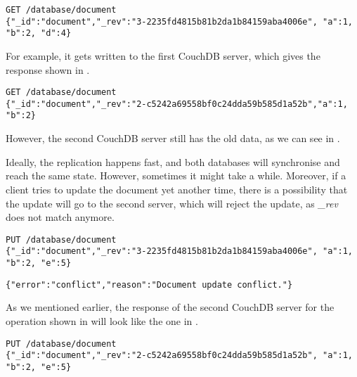\begin{lstlisting}[caption={The result of requesting the \textit{document} from CouchDB-1.}, label={lst:rwork5}]
GET /database/document
{"_id":"document","_rev":"3-2235fd4815b81b2da1b84159aba4006e", "a":1, "b":2, "d":4}
\end{lstlisting}

For example, it gets written to the first CouchDB server, which gives the response shown in .

\begin{lstlisting}[caption={The result of requesting the \textit{document} from CouchDB-2.}, label={lst:rwork6}]
GET /database/document
{"_id":"document","_rev":"2-c5242a69558bf0c24dda59b585d1a52b","a":1, "b":2}
\end{lstlisting}

However, the second CouchDB server still has the old data, as we can see in .

Ideally, the replication happens fast, and both databases will synchronise and reach the same state. However, sometimes it might take a while. Moreover, if a client tries to update the document yet another time, there is a possibility that the update will go to the second server, which will reject the update, as \textit{\_rev} does not match anymore. 

\begin{lstlisting}[caption={Updating the value of item \textit{document} by adding element \textit{e} and removing previously added element \textit{d}}, label={lst:rwork7}]
PUT /database/document
{"_id":"document","_rev":"3-2235fd4815b81b2da1b84159aba4006e", "a":1, "b":2, "e":5}
\end{lstlisting}

\begin{lstlisting}[caption={The demonstration of a conflict situation happening, when the \textit{\_rev} of sent operation and the one at the server do not match.}, label={lst:rwork8}]
{"error":"conflict","reason":"Document update conflict."}
\end{lstlisting}

As we mentioned earlier, the response of the second CouchDB server for the operation shown in  will look like the one in .

\begin{lstlisting}[caption={Updating the value of item \textit{document} by adding element \textit{e} and removing previously added element \textit{d} after receiving the new \textit{\_rev} from the second CouchDB server.}, label={lst:rwork9}]
PUT /database/document
{"_id":"document","_rev":"2-c5242a69558bf0c24dda59b585d1a52b", "a":1, "b":2, "e":5}
\end{lstlisting}

